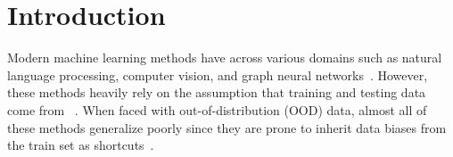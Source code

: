 \section{Introduction}
Modern machine learning methods have  across various domains such as natural language processing, computer vision, and graph neural networks~\citep{gcn,bert,gin}.
However, these methods heavily rely on the assumption that training and testing data come from ~\citep{liu2023outofdistribution, peters2016casual}.
When faced with out-of-distribution (OOD) data, almost all of these methods
generalize poorly since they are prone to inherit data biases from the train set as shortcuts~\citep{wilds,domainbed,good_bench,drugood,xie2024enhancing}.

